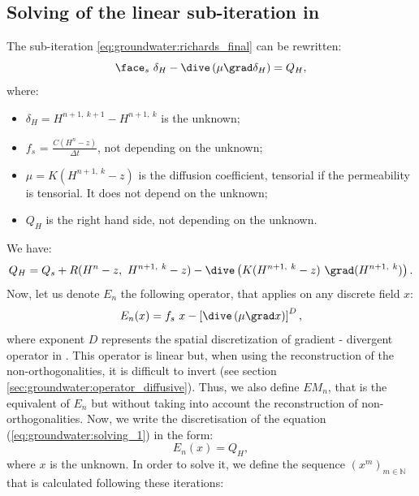 \subsection{Solving of the linear sub-iteration in \CS} \label{sec:groundwater:solving}
The sub-iteration \eqref{eq:groundwater:richards_final} can be rewritten:
\begin{equation}
 \label{eq:groundwater:solving_1}
\face_s \ \delta_H - \dive \left( \mu \grad \delta_H \right) = Q_H,
\end{equation}
where:
\begin{itemize}
\item[$\bullet$] $\delta_H = H^{ n+1, \ k+1} - H^{ n+1, \ k}$ is the unknown;
\item[$\bullet$] $f_s$ = $\frac{C(H^n-z)}{\Delta t}$, not depending on the unknown;
\item[$\bullet$] $\mu = K(H^{ n+1, \ k} - z)$ is the diffusion coefficient, tensorial if the permeability is tensorial. It does not depend on the unknown;
\item[$\bullet$] $Q_H$ is the right hand side, not depending on the unknown.
\end{itemize}
We have:
\begin{equation}
\label{eq:groundwater:qh}
Q_H = Q_s + R(H^n - z, \ H^{ n+1, \ k} - z) - \dive \left( K(H^{ n+1, \ k} - z) \
\grad(H^{ n+1, \ k}) \right).
\end{equation}
Now, let us denote $E_n$ the following operator, that applies on any discrete field $x$:
\begin{equation}
\label{eq:groundwater:epsilon}
E_n(x) = f_s \ x - \left[ \dive \left( \mu \grad x \right) \right]^D,
\end{equation}
where exponent $D$ represents the spatial discretization of gradient - divergent operator in \CS. This operator is linear but, when using
the reconstruction of the non-orthogonalities, it is difficult to invert (see section \ref{sec:groundwater:operator_diffusive}).
Thus, we also define $EM_n$, that is the equivalent of $E_n$ but without taking into account the reconstruction of non-orthogonalities.
Now, we write the discretisation of the equation (\ref{eq:groundwater:solving_1}) in the form:
\begin{equation}
\label{eq:groundwater:solving_2}
E_n(x) = Q_H,
\end{equation}
where $x$ is the unknown. In order to solve it, we define the sequence $(x^m)_{m \in \mathbb{N}}$
that is calculated following these iterations:
